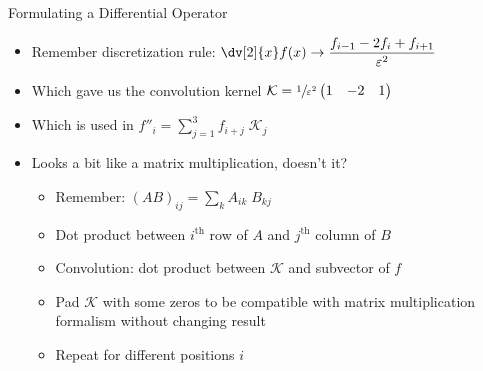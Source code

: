 \begin{frame}{Formulating a Differential Operator}
%
\begin{itemize}
\setlength\itemsep{3pt}
\item Remember discretization rule: $\dv[2]{x}f(x) \to \dfrac{f_{i-1} - 2f_i + f_{i+1}}{\varepsilon^2}$
\item Which gave us the convolution kernel $\mathcal{K} = \sfrac{1}{\varepsilon^2}
\begin{pmatrix}
1 & -2 & 1
\end{pmatrix}
$
\item Which is used in $f''_i = \sum_{j=1}^{3} f_{i+j} \; \mathcal{K}_j$
\item Looks a bit like a matrix multiplication, doesn't it?
	\begin{itemize}
	\setlength\itemsep{2pt}
	\item Remember: $(AB)_{ij} = \sum_k A_{ik} \; B_{kj}$
	\item Dot product between $i^{\text{th}}$ row of $A$ and $j^{\text{th}}$ column of $B$
	\item Convolution: dot product between $\mathcal{K}$ and subvector of $f$
	\item Pad $\mathcal{K}$ with some zeros to be compatible with matrix multiplication formalism without changing result
	\item Repeat for different positions $i$
	\end{itemize}
\end{itemize}
%
\end{frame}


